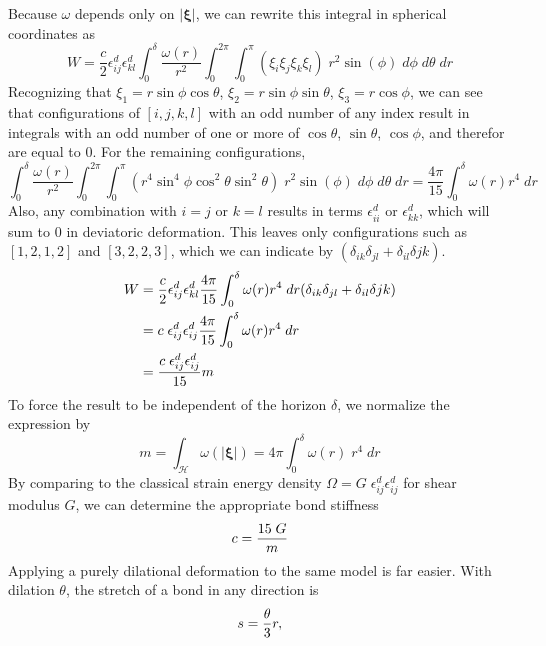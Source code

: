 Because $\omega$ depends only on $|\boldsymbol{\xi}|$, we can rewrite this integral in spherical coordinates as
\begin{equation}
W= \frac{c}{2}\epsilon_{ij}^d \epsilon_{kl}^d \int_0^\delta \frac{\omega(r)}{r^2}\int_0^{2\pi}\int_0^\pi (\xi_i\xi_j\xi_k\xi_l)\;r^2 \sin(\phi)\;d\phi\;d\theta\;dr
\end{equation}
Recognizing that $\xi_1 = r \sin\phi\cos\theta$, $\xi_2=r\sin\phi\sin\theta$, $\xi_3=r\cos\phi$, we can see that configurations of $[i,j,k,l]$ with an odd number of any index result in integrals with an odd number of one or more of $\cos\theta$, $\sin\theta$, $\cos\phi$, and therefor are equal to 0. 
For the remaining configurations,
\begin{equation}
\int_0^\delta \frac{\omega(r)}{r^2}\int_0^{2\pi}\int_0^\pi (r^4 \sin^4 \phi \cos^2\theta\sin^2\theta)\;r^2 \sin(\phi)\;d\phi\;d\theta\;dr =  \frac{4\pi}{15} \int_0^\delta \omega(r)r^4\;dr
\end{equation}
Also, any combination with $i=j$ or $k=l$ results in terms $\epsilon_{ii}^d$ or  $\epsilon_{kk}^d$, which will sum to 0 in deviatoric deformation. 
This leaves only configurations such as $[1,2,1,2]$ and $[3,2,2,3]$, which we can indicate by $(\delta_{ik}\delta_{jl}+\delta_{il}\delta{jk})$.
\begin{align}
W&= \frac{c}{2}\epsilon_{ij}^d \epsilon_{kl}^d \frac{4\pi}{15} \int_0^\delta \omega(r)r^4\;dr (\delta_{ik}\delta_{jl}+\delta_{il}\delta{jk})\notag\\
&= c \;\epsilon_{ij}^d\epsilon_{ij}^d \frac{4\pi}{15} \int_0^\delta \omega(r)r^4\;dr \notag\\
&= \frac{c\; \epsilon_{ij}^d\epsilon_{ij}^d }{15}m\notag
\end{align}
To force the result to be independent of the horizon $\delta$, we normalize the expression by
\begin{equation}
\label{eq:weighted}
m=\int_\mathcal{H}\omega(|\boldsymbol{\xi}|) = 4\pi \int_0^\delta \omega(r)\;r^4\;dr
\end{equation}
By comparing to the classical strain energy density $\Omega = G\;\epsilon_{ij}^d\epsilon_{ij}^d$ for shear modulus $G$, we can determine the appropriate bond stiffness
\begin{equation}
c = \frac{15\;G}{m}\notag
\end{equation}
Applying a purely dilational deformation to the same model is far easier.
With dilation $\theta$, the stretch of a bond in any direction is
\begin{equation}
s = \frac{\theta}{3} r,\notag
\end{equation}
